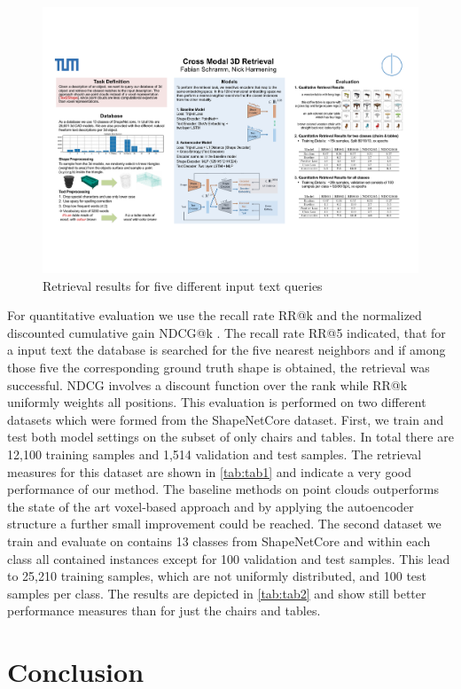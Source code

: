 \documentclass[10pt,twocolumn,letterpaper]{article}
\begin{document}
\begin{figure}[t]%
	\centering
	\includegraphics[width=1\linewidth]{fig5.pdf}
	\caption[]{Retrieval results for five different input text queries}
	\label{fig:retrieval}
\end{figure}

For quantitative evaluation we use the recall rate RR@k and the normalized discounted cumulative gain NDCG@k \cite{J_rvelin2002ndcg}. The recall rate RR@5 indicated, that for a input text the database is searched for the five nearest neighbors and if among those five the corresponding ground truth shape is obtained, the retrieval was successful. NDCG involves a discount function over the rank while RR@k uniformly weights all positions. This evaluation is performed on two different datasets which were formed from the ShapeNetCore dataset. First, we train and test both model settings on the subset of only chairs and tables. In total there are  12,100 training samples and 1,514 validation and test samples. The retrieval measures for this dataset are shown in \autoref{tab:tab1} and indicate a very good performance of our method. The baseline methods on point clouds outperforms the state of the art voxel-based approach and by applying the autoencoder structure a further small improvement could be reached. The second dataset we train and evaluate on contains 13 classes from ShapeNetCore and within each class all contained instances except for 100 validation and test samples. This lead to 25,210 training samples, which are not uniformly distributed, and 100 test samples per class. The results are depicted in \autoref{tab:tab2} and show still better performance measures than for just the chairs and tables.

\section{Conclusion}

{\small


}
\end{document}
